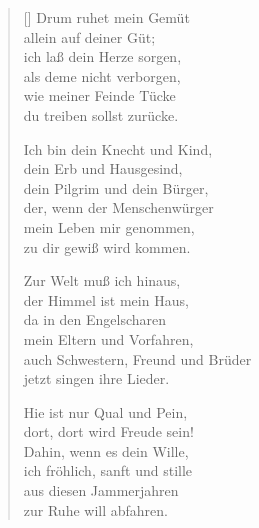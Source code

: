 \begin{multicols}{2}
\begin{verse}[\versewidth]
 Drum ruhet mein Gemüt\\
allein auf deiner Güt;\\
ich laß dein Herze sorgen,\\
als deme nicht verborgen,\\
wie meiner Feinde Tücke\\
du treiben sollst zurücke.

 Ich bin dein Knecht und Kind,\\
dein Erb und Hausgesind,\\
dein Pilgrim und dein Bürger,\\
der, wenn der Menschenwürger\\
mein Leben mir genommen,\\
zu dir gewiß wird kommen.

 Zur Welt muß ich hinaus,\\
der Himmel ist mein Haus,\\
da in den Engelscharen\\
mein Eltern und Vorfahren,\\
auch Schwestern, Freund und Brüder\\
jetzt singen ihre Lieder.

 Hie ist nur Qual und Pein,\\
dort, dort wird Freude sein!\\
Dahin, wenn es dein Wille,\\
ich fröhlich, sanft und stille\\
aus diesen Jammerjahren\\
zur Ruhe will abfahren.

\end{verse}
\end{multicols}

